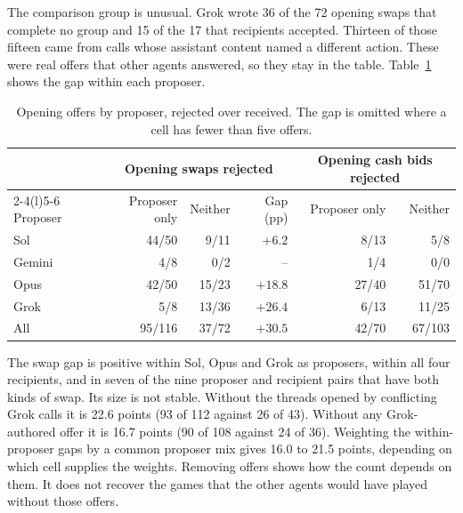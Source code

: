 \documentclass[11pt,letterpaper]{article}
\begin{document}
The comparison group is unusual. Grok wrote 36 of the 72 opening swaps that complete no group and 15 of the 17 that recipients accepted. Thirteen of those fifteen came from calls whose assistant content named a different action. These were real offers that other agents answered, so they stay in the table. Table~\ref{tab:proposer} shows the gap within each proposer.

\begin{table}[htbp]\centering\small
\begin{tabular}{@{}lrrrrr@{}}\toprule
 & \multicolumn{3}{c}{Opening swaps rejected} & \multicolumn{2}{c}{Opening cash bids rejected}\\\cmidrule(lr){2-4}\cmidrule(l){5-6}
Proposer & Proposer only & Neither & Gap (pp) & Proposer only & Neither\\\midrule
Sol & 44/50 & 9/11 & $+6.2$ & 8/13 & 5/8\\
Gemini & 4/8 & 0/2 & -- & 1/4 & 0/0\\
Opus & 42/50 & 15/23 & $+18.8$ & 27/40 & 51/70\\
Grok & 5/8 & 13/36 & $+26.4$ & 6/13 & 11/25\\\midrule
All & 95/116 & 37/72 & $+30.5$ & 42/70 & 67/103\\\bottomrule
\end{tabular}
\caption{Opening offers by proposer, rejected over received. The gap is omitted where a cell has fewer than five offers.}
\label{tab:proposer}
\end{table}

The swap gap is positive within Sol, Opus and Grok as proposers, within all four recipients, and in seven of the nine proposer and recipient pairs that have both kinds of swap. Its size is not stable. Without the threads opened by conflicting Grok calls it is 22.6 points (93 of 112 against 26 of 43). Without any Grok-authored offer it is 16.7 points (90 of 108 against 24 of 36). Weighting the within-proposer gaps by a common proposer mix gives 16.0 to 21.5 points, depending on which cell supplies the weights. Removing offers shows how the count depends on them. It does not recover the games that the other agents would have played without those offers.
\end{document}
